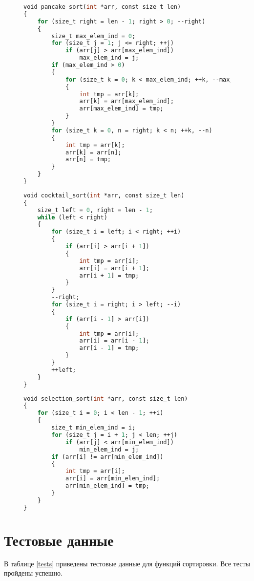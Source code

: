 \begin{figure}[H]
	\begin{lstlisting}[label=pancake,caption=Функция блинной сортировки, language=Caml]
void pancake_sort(int *arr, const size_t len)
{
	for (size_t right = len - 1; right > 0; --right)
	{
		size_t max_elem_ind = 0;
		for (size_t j = 1; j <= right; ++j)
			if (arr[j] > arr[max_elem_ind])
				max_elem_ind = j;
		if (max_elem_ind > 0)
		{
			for (size_t k = 0; k < max_elem_ind; ++k, --max_elem_ind)
			{
				int tmp = arr[k];
				arr[k] = arr[max_elem_ind];
				arr[max_elem_ind] = tmp;
			}
		}
		for (size_t k = 0, n = right; k < n; ++k, --n)
		{
			int tmp = arr[k];
			arr[k] = arr[n];
			arr[n] = tmp;
		}
	}
}
	\end{lstlisting}
\end{figure}
\begin{figure}[H]
	\begin{lstlisting}[label=cocktail,caption=Функция сортировки перемешиванием, language=Caml]
void cocktail_sort(int *arr, const size_t len)
{
	size_t left = 0, right = len - 1;
	while (left < right)
	{
		for (size_t i = left; i < right; ++i)
		{
			if (arr[i] > arr[i + 1])
			{
				int tmp = arr[i];
				arr[i] = arr[i + 1];
				arr[i + 1] = tmp;
			}
		}
		--right;
		for (size_t i = right; i > left; --i)
		{
			if (arr[i - 1] > arr[i])
			{
				int tmp = arr[i];
				arr[i] = arr[i - 1];
				arr[i - 1] = tmp;
			}
		}
		++left;
	}
}
	\end{lstlisting}
\end{figure}
\begin{figure}[H]
	\begin{lstlisting}[label=selection,caption=Функция сортировки выбором, language=Caml]
void selection_sort(int *arr, const size_t len)
{
	for (size_t i = 0; i < len - 1; ++i)
	{
		size_t min_elem_ind = i;
		for (size_t j = i + 1; j < len; ++j)
			if (arr[j] < arr[min_elem_ind])
				min_elem_ind = j;
		if (arr[i] != arr[min_elem_ind])
		{
			int tmp = arr[i];
			arr[i] = arr[min_elem_ind];
			arr[min_elem_ind] = tmp;
		}
	}
}
	\end{lstlisting}
\end{figure}

\section{Тестовые данные}

В таблице \ref{tests} приведены тестовые данные для функций сортировки. Все тесты пройдены успешно.

